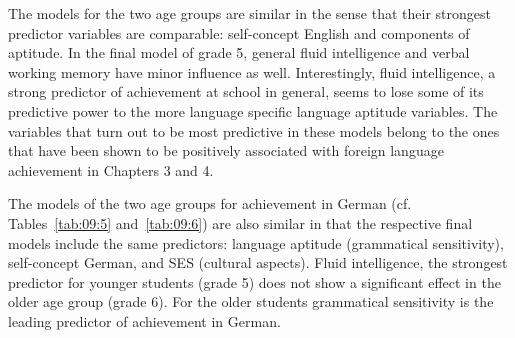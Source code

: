 \documentclass[output=paper]{langsci/langscibook}
\begin{document}
\begin{table}
\caption{Grade 6 – results of the stepwise multiple regression analysis for achievement in English (c-test T3) with predictors T1; $***p<0.001$; $n= 223$. GS: Grammatical sensitivity, SCE: Self-concept English, IA: Inductive ability.}
\end{table}

The models for the two age groups are similar in the sense that their strongest predictor variables are comparable: self-concept English and components of aptitude. In the final model of grade 5, general fluid intelligence and verbal working memory have minor influence as well. Interestingly, fluid intelligence, a strong predictor of achievement at school in general, seems to lose some of its predictive power to the more language specific language aptitude variables. The variables that turn out to be most predictive in these models belong to the ones that have been shown to be positively associated with foreign language achievement in Chapters 3 and 4.

The models of the two age groups for achievement in German (cf. Tables~\ref{tab:09:5} and~\ref{tab:09:6}) are also similar in that the respective final models include the same predictors: language aptitude (grammatical sensitivity), self-concept German, and SES (cultural aspects). Fluid intelligence, the strongest predictor for younger students (grade 5) does not show a significant effect in the older age group (grade 6). For the older students grammatical sensitivity is the leading predictor of achievement in German.
\end{document}
